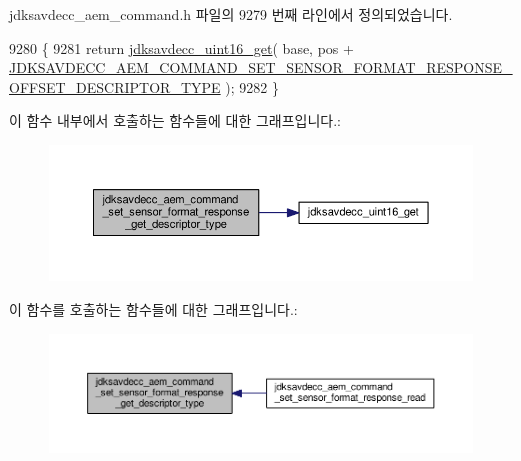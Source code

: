 jdksavdecc\+\_\+aem\+\_\+command.\+h 파일의 9279 번째 라인에서 정의되었습니다.


\begin{DoxyCode}
9280 \{
9281     \textcolor{keywordflow}{return} \hyperlink{group__endian_ga3fbbbc20be954aa61e039872965b0dc9}{jdksavdecc\_uint16\_get}( base, pos + 
      \hyperlink{group__command__set__sensor__format__response_ga3bb2e7b1633ba4273960ebbb753c6540}{JDKSAVDECC\_AEM\_COMMAND\_SET\_SENSOR\_FORMAT\_RESPONSE\_OFFSET\_DESCRIPTOR\_TYPE}
       );
9282 \}
\end{DoxyCode}


이 함수 내부에서 호출하는 함수들에 대한 그래프입니다.\+:
\nopagebreak
\begin{figure}[H]
\begin{center}
\leavevmode
\includegraphics[width=350pt]{group__command__set__sensor__format__response_ga6d6efc5ea01d2f023333e5fe9a8cf6f4_cgraph}
\end{center}
\end{figure}




이 함수를 호출하는 함수들에 대한 그래프입니다.\+:
\nopagebreak
\begin{figure}[H]
\begin{center}
\leavevmode
\includegraphics[width=350pt]{group__command__set__sensor__format__response_ga6d6efc5ea01d2f023333e5fe9a8cf6f4_icgraph}
\end{center}
\end{figure}


